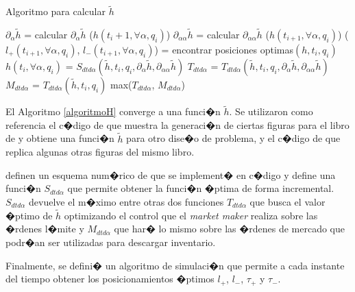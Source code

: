 \documentclass[12pt,a4paper,spanish]{article}%
\begin{document}
\begin{algorithm}[H]
	\caption{Algoritmo para calcular $\tilde{h}$}
	\begin{algorithmic}[1]
				\State $\partial_\alpha$$\tilde{h}$ = calcular $\partial_\alpha$$\tilde{h}$ ($h(t_i+1,\forall \alpha,q_i)$)
				\State $\partial_{\alpha \alpha}$$\tilde{h}$ = calcular $\partial_{\alpha \alpha}$$\tilde{h}$ ($h(t_{i+1},\forall \alpha,q_i)$)
				\State ($l_+(t_{i + 1}, \forall \alpha, q_i)$, $l_-(t_{i + 1}, \forall \alpha, q_i)$) = encontrar posiciones optimas$(h, t_i, q_i)$
				\State $h(t_{i},\forall \alpha,q_i)$ = $S_{dt d\alpha}(\tilde{h}, t_i, q_i, \partial_\alpha \tilde{h}, \partial_{\alpha \alpha}\tilde{h})$
			\EndFor
		\EndFor
		\EndProcedure
		\State $T_{dt d\alpha}$ = $T_{dt d\alpha}(\tilde{h}, t_i, q_i, \partial_\alpha \tilde{h}, \partial_{\alpha \alpha}\tilde{h})$
		\State $M_{dt d\alpha}$ = $T_{dt d\alpha}(\tilde{h}, t_i, q_i)$
		\State \Return max($T_{dt d\alpha}$, $M_{dt d\alpha}$)
		\EndProcedure
	\end{algorithmic}
\label{algoritmoH}	
\end{algorithm}


El Algoritmo \ref{algoritmoH} converge a una funci�n $\tilde{h}$. Se utilizaron como referencia el c�digo de \cite{JaimungalCodigo} que muestra la generaci�n de ciertas figuras para el libro de \cite{Cartea2019a} y obtiene una funci�n $\tilde{h}$ para otro dise�o de problema, y el c�digo de \cite{KHelertCode} que replica algunas otras figuras del mismo libro.

\cite{Cartea2019} definen un esquema num�rico de que se implement� en c�digo y define una funci�n $S_{dt d\alpha}$ que permite obtener la funci�n �ptima de forma incremental. $S_{dt d\alpha}$ devuelve el m�ximo entre otras dos funciones $T_{dt d\alpha}$ que busca el valor �ptimo de $\tilde{h}$ optimizando el control que el \textit{market maker} realiza sobre las �rdenes l�mite y $M_{dt d\alpha}$ que har� lo mismo sobre las �rdenes de mercado que podr�an ser utilizadas para descargar inventario.

Finalmente, se defini� un algoritmo de simulaci�n que permite a cada instante del tiempo obtener los posicionamientos �ptimos $l_+$, $l_-$, $\tau_+$ y $\tau_-$.
\end{document}

